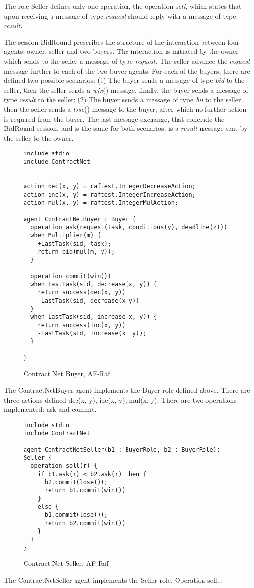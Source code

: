 \documentclass[a4paper,12pt,oneside,fleqn]{book} %
\begin{document}
The role Seller defines only one operation, the operation \textit{sell},
which states that upon receiving a message of type \textit{request} should reply
with a message of type \textit{result}.

The session BidRound prescribes the structure of the interaction between
four agents: owner, seller and two buyers. The interaction is initiated by
the owner which sends to the seller a message of type \textit{request}. The
seller advance the \textit{request} message further to each of the two
buyer agents. For each of the buyers, there are defined two possible
scenarios: (1) The buyer sends a message of type \textit{bid} to the
seller, then the seller sends a \textit{win}() message, finally, the buyer
sends a message of type \textit{result} to the seller; (2) The buyer sends
a message of type \textit{bit} to the seller, then the seller sends a
\textit{lose}() message to the buyer, after which no further action is
required from the buyer. The last message exchange, that conclude the
BidRound session, and is the same for both scenarios, is a \textit{result}
message sent by the seller to the owner.

\begin{figure}\footnotesize %
\begin{verbatim}
include stdio
include ContractNet


action dec(x, y) = raftest.IntegerDecreaseAction;
action inc(x, y) = raftest.IntegerIncreaseAction;
action mul(x, y) = raftest.IntegerMulAction;

agent ContractNetBuyer : Buyer {
  operation ask(request(task, conditions(y), deadline(z)))
  when Multiplier(m) {
    +LastTask(sid, task);
    return bid(mul(m, y));
  }
  
  operation commit(win()) 
  when LastTask(sid, decrease(x, y)) { 
    return success(dec(x, y)); 
    -LastTask(sid, decrease(x,y))
  }
  when LastTask(sid, increase(x, y)) {
    return success(inc(x, y));  
    -LastTask(sid, increase(x, y));
  }

}
\end{verbatim}
\caption{Contract Net Buyer, AF-Raf}
\label{fig:contract-buyer}
\end{figure} %

The ContractNetBuyer agent implements the Buyer role defined above. There
are three actions defined dec(x, y), inc(x, y), mul(x, y). There are two
operations implemented: ask and commit.

\begin{figure}\footnotesize %
\begin{verbatim}
include stdio
include ContractNet

agent ContractNetSeller(b1 : BuyerRole, b2 : BuyerRole): Seller {
  operation sell(r) {
    if b1.ask(r) < b2.ask(r) then { 
      b2.commit(lose());
      return b1.commit(win());
    }                   
    else { 
      b1.commit(lose());
      return b2.commit(win()); 
    }
  }
}
\end{verbatim}
\caption{Contract Net Seller, AF-Raf}
\label{fig:contract-seller}
\end{figure} %
The ContractNetSeller agent implements the Seller role. Operation sell...
\end{document}
